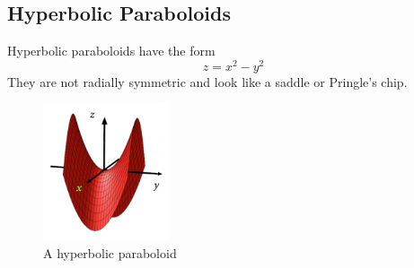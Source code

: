 \subsection{Hyperbolic Paraboloids}
\noindent
Hyperbolic paraboloids have the form
\begin{equation*}
	z = x^2 - y^2
\end{equation*} 
They are not radially symmetric and look like a saddle or Pringle's chip.

\begin{figure}[H]
	\centering
	\includegraphics[width=0.33\textwidth]{./Images/differentialMultivariableCalculus/hyperbolic_paraboloid.png}
	\caption{A hyperbolic paraboloid}
\end{figure}